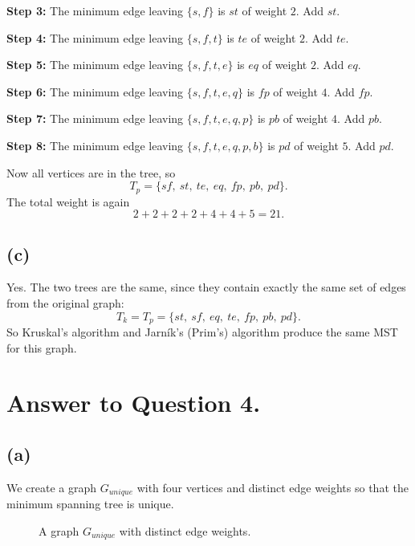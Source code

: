 \documentclass{brockcosc3p03}
\begin{document}
\textbf{Step 3:} The minimum edge leaving $\{s,f\}$ is $st$ of weight $2$. Add $st$.

\textbf{Step 4:} The minimum edge leaving $\{s,f,t\}$ is $te$ of weight $2$. Add $te$.

\textbf{Step 5:} The minimum edge leaving $\{s,f,t,e\}$ is $eq$ of weight $2$. Add $eq$.

\textbf{Step 6:} The minimum edge leaving $\{s,f,t,e,q\}$ is $fp$ of weight $4$. Add $fp$.

\textbf{Step 7:} The minimum edge leaving $\{s,f,t,e,q,p\}$ is $pb$ of weight $4$. Add $pb$.

\textbf{Step 8:} The minimum edge leaving $\{s,f,t,e,q,p,b\}$ is $pd$ of weight $5$. Add $pd$.

Now all vertices are in the tree, so
\[
T_p = \{sf,\ st,\ te,\ eq,\ fp,\ pb,\ pd\}.
\]
The total weight is again
\[
2+2+2+2+4+4+5 = 21.
\]

\subsection*{(c)}

Yes. The two trees are the same, since they contain exactly the same set of edges from the original graph:
\[
T_k = T_p = \{st,\ sf,\ eq,\ te,\ fp,\ pb,\ pd\}.
\]
So Kruskal's algorithm and Jarn\'ik's (Prim's) algorithm produce the same MST for this graph.



\newpage
\section*{Answer to Question 4.}

\subsection*{(a)}

We create a graph $G_{unique}$ with four vertices and distinct edge weights so that the minimum spanning tree is unique.

\begin{figure}[H]
\centering
{}
\caption{A graph $G_{unique}$ with distinct edge weights.}
\label{fig:gunique}
\end{figure}
\end{document}
